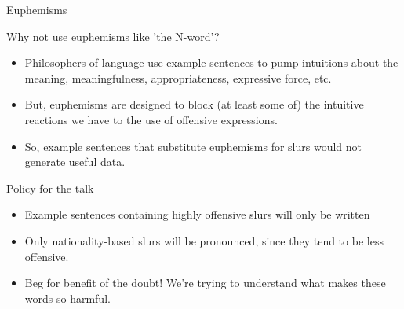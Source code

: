 \documentclass[xcolor=dvipsnames,12pt,handout]{beamer}
\begin{document}
\begin{frame}{Euphemisms}


\vspace{-1cm}
Why not use euphemisms like 'the N-word'?
\pause
\begin{itemize}\setlength\itemsep{2mm}
\item Philosophers of language use example sentences to pump intuitions about the meaning, meaningfulness, appropriateness, expressive force, etc.
\pause
\item But, euphemisms are designed to block (at least some of) the intuitive reactions we have to the use of offensive expressions.
\pause
\item So, example sentences that substitute euphemisms for slurs would not generate useful data.
\end{itemize}  


\end{frame}

\begin{frame}{Policy for the talk}


\vspace{-1cm}

\pause
\begin{itemize}\setlength\itemsep{6mm}
\item Example sentences containing highly offensive slurs will only be written 
\pause
\item Only nationality-based slurs will be pronounced, since they tend to be less offensive.
\pause
\item Beg for benefit of the doubt! We're trying to understand what makes these words so harmful.
\end{itemize}  


\end{frame}
\end{document}
